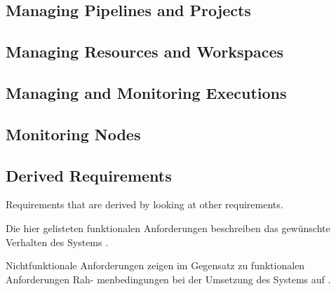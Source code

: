 \subsection{Managing Pipelines and Projects}
\begin{itemize}
\end{itemize}

\subsection{Managing Resources and Workspaces}
\begin{itemize}
\end{itemize}


\subsection{Managing and Monitoring Executions}
\begin{itemize}
\end{itemize}

\subsection{Monitoring Nodes}
\begin{itemize}
\end{itemize}

\subsection{Derived Requirements}
Requirements that are derived by looking at other requirements.



Die hier gelisteten funktionalen Anforderungen beschreiben das gewünschte Verhalten des
Systems \cite[155]{goll2012methoden}.

Nichtfunktionale Anforderungen zeigen im Gegensatz zu funktionalen Anforderungen Rah-
menbedingungen bei der Umsetzung des Systems auf \cite[155]{goll2012methoden}.



